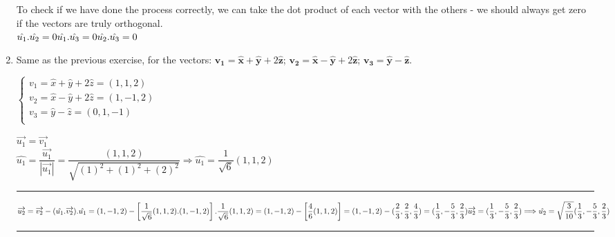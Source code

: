\documentclass[fleqn]{article}
\begin{document}
\begin{enumerate}
    \textcolor{hwColor}{
      To check if we have done the process correctly, we can take the dot product of each vector with the others - we should always get zero if the vectors are truly orthogonal. \\
      $
        \hat{u_1}.\hat{u_2}=0 \\
        \hat{u_1}.\hat{u_3}=0 \\
        \hat{u_2}.\hat{u_3}=0 \\
      $
    }

    \item  Same as the previous exercise, for the vectors:
      $\mathbf{v_1}=\mathbf{\hat{x}}+\mathbf{\hat{y}}+2\mathbf{\hat{z}}$; $\mathbf{v_2}=\mathbf{\hat{x}}-\mathbf{\hat{y}}+2\mathbf{\hat{z}}$; $\mathbf{v_3}=\mathbf{\hat{y}}-\mathbf{\hat{z}}$.  
      
      \textcolor{hwColor}{
        $
          \begin{cases}
            v_1=\hat{x}+\hat{y}+2\hat{z}=(1,1,2) \\
            v_2=\hat{x}-\hat{y}+2\hat{z}=(1,-1,2) \\
            v_3=\hat{y}-\hat{z}=(0,1,-1) \\
          \end{cases}
        $
      }

      \textcolor{hwColor}{
        $\overrightarrow{u_1}=\overrightarrow{v_1}$ \\
        $
          \hat{u_1}=\dfrac{\overrightarrow{u_1}}{|\overrightarrow{u_1}|}=\dfrac{(1,1,2)}{\sqrt{(1)^2+(1)^2+(2)^2}} \Longrightarrow \hat{u_1}=\dfrac{1}{\sqrt{6}}(1,1,2)
        $
      }

      \textcolor{hwColor}{ 
        \rule{15cm}{0.4pt} 
      }

      \textcolor{hwColor}{ 
        $
        \overrightarrow{u_2}=\overrightarrow{v_2}-(\hat{u_1}.\overrightarrow{v_2}).\hat{u_1}=(1,-1,2)-\left[\dfrac{1}{\sqrt{6}}(1,1,2).(1,-1,2)\right].\dfrac{1}{\sqrt{6}}(1,1,2) \\
        =(1,-1,2)-\left[\dfrac{4}{6}(1,1,2)\right]=(1,-1,2)-(\dfrac{2}{3},\dfrac{2}{3},\dfrac{4}{3})=(\dfrac{1}{3},-\dfrac{5}{3},\dfrac{2}{3}) \\
        \overrightarrow{u_2}=(\dfrac{1}{3},-\dfrac{5}{3},\dfrac{2}{3}) \Longrightarrow \hat{u_2}=\sqrt{\dfrac{3}{10}}(\dfrac{1}{3},-\dfrac{5}{3},\dfrac{2}{3})
        $
      }

      \textcolor{hwColor}{ 
        \rule{15cm}{0.4pt} 
      }


\end{enumerate}
\end{document}
